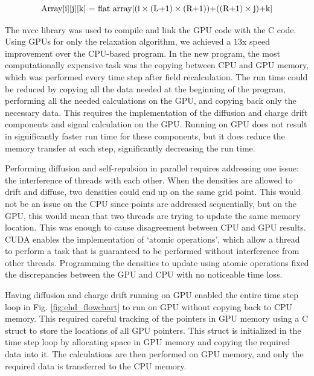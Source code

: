 \begin{equation}{\label{flat_array}}
 \text{Array[i][j][k] = flat array[(i} \times \text{(L+1)}\times \text{(R+1))+((R+1)}\times \text{j)+k]}
\end{equation}

The nvcc library was used to compile and link the GPU {\cpp} code with the {\tdsim} C code. Using GPUs for only the relaxation algorithm, we achieved a $13$x speed improvement over the CPU-based program. In the new program, the most computationally expensive task was the copying between CPU and GPU memory, which was performed every time step after field recalculation. The run time could be reduced by copying all the data needed at the beginning of the program, performing all the needed calculations on the GPU, and copying back only the necessary data. This requires the implementation of the diffusion and charge drift components and signal calculation on the GPU. Running on GPU does not result in significantly faster run time for these components, but it does reduce the memory transfer at each step, significantly decreasing the run time.

Performing diffusion and self-repulsion in parallel requires addressing one issue: the interference of threads with each other. When the densities are allowed to drift and diffuse, two densities could end up on the same grid point. This would not be an issue on the CPU since points are addressed sequentially, but on the GPU, this would mean that two threads are trying to update the same memory location. This was enough to cause disagreement between CPU and GPU results. CUDA enables the implementation of `atomic operations', which allow a thread to perform a task that is guaranteed to be performed without interference from other threads. Programming the densities to update using atomic operations fixed the discrepancies between the GPU and CPU with no noticeable time loss. 


Having diffusion and charge drift running on GPU enabled the entire time step loop in Fig. \ref{fig:ehd_flowchart} to run on GPU without copying back to CPU memory. This required careful tracking of the pointers in GPU memory using a C struct to store the locations of all GPU pointers. This struct is initialized in the time step loop by allocating space in GPU memory and copying the required data into it. The calculations are then performed on GPU memory, and only the required data is transferred to the CPU memory.

